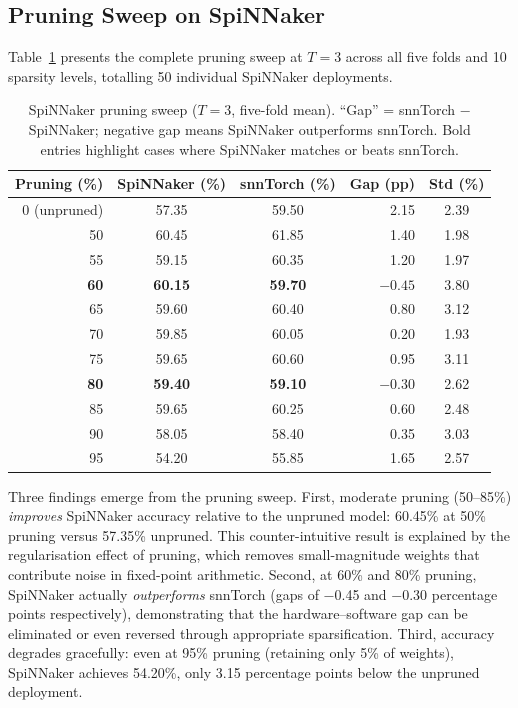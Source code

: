 \subsection{Pruning Sweep on SpiNNaker}
\label{ssec:pruning-results}

Table~\ref{tab:pruning-sweep} presents the complete pruning sweep at $T = 3$ across all five folds and 10 sparsity levels, totalling 50 individual SpiNNaker deployments.

\begin{table}[t]
\centering
\caption{SpiNNaker pruning sweep ($T = 3$, five-fold mean). ``Gap'' = snnTorch $-$ SpiNNaker; negative gap means SpiNNaker outperforms snnTorch. Bold entries highlight cases where SpiNNaker matches or beats snnTorch.}
\label{tab:pruning-sweep}
\small
\begin{tabular}{@{}rccrc@{}}
\toprule
\textbf{Pruning (\%)} & \textbf{SpiNNaker (\%)} & \textbf{snnTorch (\%)} & \textbf{Gap (pp)} & \textbf{Std (\%)} \\
\midrule
0  (unpruned)  & 57.35 & 59.50 &  2.15 & 2.39 \\
50             & 60.45 & 61.85 &  1.40 & 1.98 \\
55             & 59.15 & 60.35 &  1.20 & 1.97 \\
\textbf{60}    & \textbf{60.15} & \textbf{59.70} & $\mathbf{-0.45}$ & 3.80 \\
65             & 59.60 & 60.40 &  0.80 & 3.12 \\
70             & 59.85 & 60.05 &  0.20 & 1.93 \\
75             & 59.65 & 60.60 &  0.95 & 3.11 \\
\textbf{80}    & \textbf{59.40} & \textbf{59.10} & $\mathbf{-0.30}$ & 2.62 \\
85             & 59.65 & 60.25 &  0.60 & 2.48 \\
90             & 58.05 & 58.40 &  0.35 & 3.03 \\
95             & 54.20 & 55.85 &  1.65 & 2.57 \\
\bottomrule
\end{tabular}
\end{table}

Three findings emerge from the pruning sweep. First, moderate pruning (50--85\%) \emph{improves} SpiNNaker accuracy relative to the unpruned model: 60.45\% at 50\% pruning versus 57.35\% unpruned. This counter-intuitive result is explained by the regularisation effect of pruning, which removes small-magnitude weights that contribute noise in fixed-point arithmetic. Second, at 60\% and 80\% pruning, SpiNNaker actually \emph{outperforms} snnTorch (gaps of $-$0.45 and $-$0.30 percentage points respectively), demonstrating that the hardware--software gap can be eliminated or even reversed through appropriate sparsification. Third, accuracy degrades gracefully: even at 95\% pruning (retaining only 5\% of weights), SpiNNaker achieves 54.20\%, only 3.15 percentage points below the unpruned deployment.

